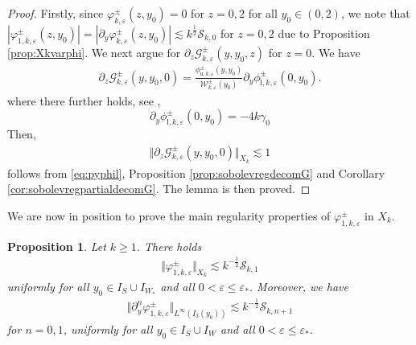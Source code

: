 \documentclass[11pt,reqno]{amsproc}
\newtheorem{proposition}{Proposition}[section]
\theoremstyle{definition}
\numberwithin{equation}{section}
\newcommand{\G}{{\mathcal{G}}}
\newcommand{\su}{{\mathsf{u}}}
\renewcommand{\sl}{{\mathsf{l}}}
\newcommand{\cS}{{\mathcal S}}
\newcommand{\W}{{\mathcal{W}}}
\newcommand{\ep}{\varepsilon}
\begin{document}
\begin{proof}
Firstly, since $\varphi_{k,\ep}^\pm(z,y_0)=0$ for $z=0,2$ for all $y_0\in (0,2)$, we note that $|\varphi_{1,k,\ep}^\pm(z,y_0)| = |\partial_y\varphi_{k,\ep}^\pm(z,y_0)|\lesssim k^\frac12\cS_{k,0}$ for $z=0,2$ due to Proposition \ref{prop:Xkvarphi}. We next argue for $\partial_z\G_{k,\ep}^\pm(y,y_0,z)$ for $z=0$. We have
\begin{align*}
\partial_z\G_{k,\ep}^\pm(y,y_0,0) = \frac{\phi_{\su,k,\ep}^\pm(y,y_0)}{\W_{k,\ep}^\pm(y_0)}\partial_y\phi_{\sl,k,\ep}^\pm(0,y_0).
\end{align*}
where there further holds, see \cite{NIST}, 
\begin{equation}\label{eq:pyphil}
\partial_y\phi_{\sl, k,\ep}^\pm(0,y_0) = -4k\gamma_0
\end{equation}
Then, 
\begin{align*}
\Vert \partial_z\G_{k,\ep}^\pm(y,y_0,0)  \Vert_{X_k} \lesssim 1
\end{align*}
follows from \eqref{eq:pyphil}, Proposition \ref{prop:sobolevregdecomG} and Corollary \ref{cor:sobolevregpartialdecomG}. The lemma is then proved. 
\end{proof}

We are now in position to prove the main regularity properties of $\varphi_{1,k,\ep}^\pm$ in $X_k$.

\begin{proposition}\label{prop:Xkvarphi1}
Let $k\geq 1$. There holds 
\begin{align*}
\Vert \varphi_{1,k,\ep}^\pm \Vert_{X_k} \lesssim k^{-\frac12}\cS_{k,1}
\end{align*}
uniformly for all $y_0\in I_S\cup I_{W_*}$ and all $0 < \ep\leq \ep_*$. Moreover, we have
\begin{align*}
\Vert \partial_y^n \varphi_{1,k,\ep}^\pm \Vert_{L^\infty(I_3(y_0))} \lesssim k^{-\frac12}\cS_{k,n+1}
\end{align*}
for $n=0,1$, uniformly for all $y_0\in I_S\cup I_{W}$ and all $0 < \ep\leq \ep_*$.
\end{proposition}
\end{document}
